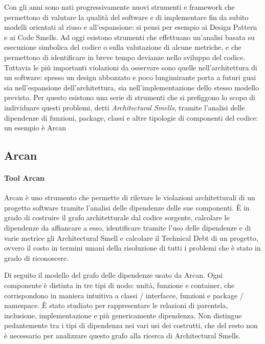 
Con gli anni sono nati progressivamente nuovi strumenti e framework che permettono di valutare la qualit\`a del software e di implementare fin da subito modelli orientati al riuso e all'espansione: si pensi per esempio ai Design Pattern \cite{gamma1995design} e ai Code Smells\cite{fowler1999refactoring}. Ad oggi esistono strumenti che effettuano un'analisi basata su esecuzione simbolica del codice o sulla valutazione di alcune metriche, e che permettono di identificare in breve tempo devianze nello sviluppo del codice. Tuttavia le pi\`u importanti violazioni da osservare sono quelle nell'architettura di un software: spesso un design abbozzato e poco lungimirante porta a futuri guai sia nell'espansione dell'architettura, sia nell'implementazione dello stesso modello previsto. Per questo esistono una serie di strumenti che si prefiggono lo scopo di individuare questi problemi, detti \emph{Architectural Smells}, tramite l'analisi delle dipendenze di funzioni, package, classi e altre tipologie di componenti del codice: un esempio \`e Arcan \cite{Arcan}

\subsection{Arcan}

\paragraph{Tool Arcan}

Arcan \`e uno strumento che permette di rilevare le violazioni architetturali di un progetto software tramite l'analisi delle dipendenze delle sue componenti. \`E in grado di costruire il grafo architetturale dal codice sorgente, calcolare le dipendenze da affiancare a esso, identificare tramite l'uso delle dipendenze e di varie metrice gli Architectural Smell e calcolare il Technical Debt di un progetto, ovvero il costo in termini umani della risoluzione di tutti i problemi che \`e stato in grado di riconoscere.

Di seguito il modello del grafo delle dipendenze usato da Arcan. Ogni componente \`e distinta in tre tipi di nodo: unit\`a, funzione e container, che corrispondono in maniera intuitiva a classi / interfacce, funzioni e package / namespace. \`E stato studiato per rappresentare le relazioni di parentela, inclusione, implementazione e pi\`u genericamente dipendenza. Non distingue pedantemente tra i tipi di dipendenza nei vari usi dei costrutti, che del resto non \`e necessario per analizzare questo grafo alla ricerca di Architectural Smells.

